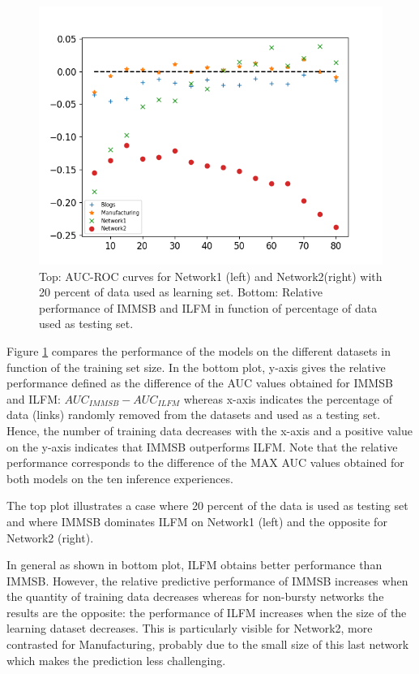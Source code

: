 \begin{figure}[h]
\begin{minipage}{0.4\textwidth}
        \includegraphics[width=\textwidth]{img/corpus/testset_max_20.png}
    \end{minipage}
    \caption{Top: AUC-ROC curves for Network1 (left) and Network2(right) with 20 percent of data used as learning set. Bottom: Relative performance of IMMSB and ILFM in function of percentage of data used as testing set.} 
\label{fig:auc}
\end{figure}



Figure \ref{fig:auc} compares the performance  of the models on the different datasets in function of the training set size. In the bottom plot,  y-axis gives the relative performance defined as the difference of the AUC values obtained for IMMSB and ILFM: $AUC_{IMMSB} - AUC_{ILFM}$ whereas x-axis indicates the percentage of data (links) randomly removed from the datasets and  used as a testing set. Hence, the number of training data decreases with the x-axis and a positive value on the y-axis indicates that IMMSB outperforms ILFM.  Note that the relative performance corresponds to the difference of the MAX AUC values obtained for both models on the ten inference experiences.

The top plot illustrates a case where 20 percent of the data is used as testing set and where IMMSB dominates ILFM on Network1 (left) and the opposite for Network2 (right).

In general as shown in bottom plot, ILFM obtains better performance than IMMSB. However, the relative predictive performance of IMMSB  increases  when the quantity of training data decreases whereas for non-bursty networks the results are the opposite: the performance of ILFM increases when the size of the learning dataset decreases. This is particularly visible for Network2, more contrasted for Manufacturing, probably due to the small size of this last network which makes the prediction less challenging.


